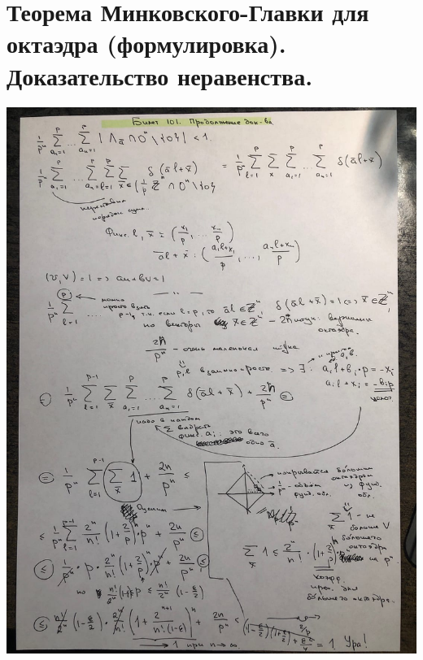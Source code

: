 \section{Теорема Минковского-Главки для октаэдра (формулировка). Доказательство неравенства.}
\includegraphics[width=15cm]{images/100_2}